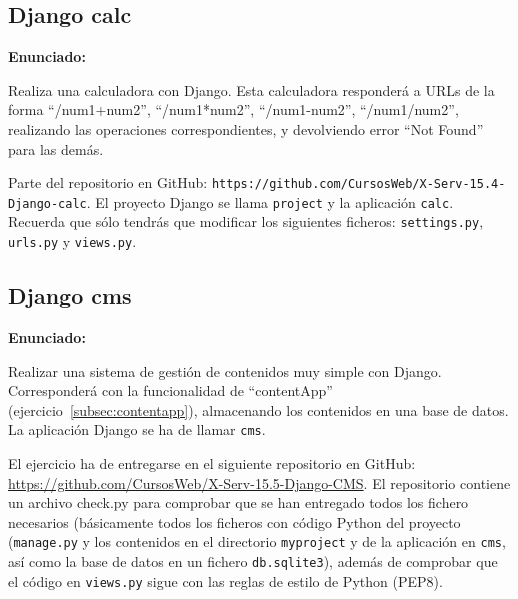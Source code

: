 \subsection{Django calc}
\label{subsec:django-calc}

\textbf{Enunciado:}

Realiza una calculadora con Django. Esta calculadora responderá a URLs de la forma ``/num1+num2'', ``/num1*num2'', ``/num1-num2'', ``/num1/num2'', realizando las operaciones correspondientes, y devolviendo error ``Not Found'' para las demás.

Parte del repositorio en GitHub: \verb|https://github.com/CursosWeb/X-Serv-15.4-Django-calc|. El proyecto Django se llama \texttt{project} y la aplicación \texttt{calc}. 
Recuerda que sólo tendrás que modificar los siguientes ficheros: \texttt{settings.py}, \texttt{urls.py} y \texttt{views.py}. 

%

\subsection{Django cms}
\label{subsec:django-cms}

\textbf{Enunciado:}

Realizar una sistema de gestión de contenidos muy simple con Django. Corresponderá con la funcionalidad de ``contentApp'' (ejercicio~\ref{subsec:contentapp}), almacenando los contenidos en una base de datos. La aplicación Django se ha de llamar \texttt{cms}.

El ejercicio ha de entregarse en el siguiente repositorio en GitHub: 
\url{https://github.com/CursosWeb/X-Serv-15.5-Django-CMS}. El repositorio contiene
un archivo check.py para comprobar que se han entregado todos los fichero necesarios (básicamente todos los ficheros con código Python del proyecto (\texttt{manage.py} y los contenidos en el directorio \texttt{myproject} y de la aplicación en \texttt{cms}, así como la base de datos en un fichero \texttt{db.sqlite3}), además de comprobar que el código en
\texttt{views.py} sigue con las reglas de estilo de Python (PEP8).

